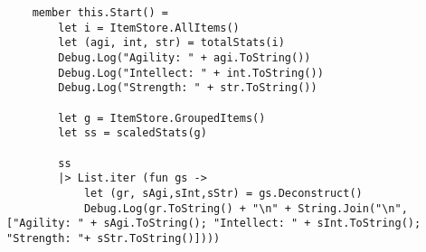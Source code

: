 \begin{listing}[H]
\begin{verbatim}
    member this.Start() =
        let i = ItemStore.AllItems()
        let (agi, int, str) = totalStats(i)
        Debug.Log("Agility: " + agi.ToString())
        Debug.Log("Intellect: " + int.ToString())
        Debug.Log("Strength: " + str.ToString())

        let g = ItemStore.GroupedItems()
        let ss = scaledStats(g)

        ss
        |> List.iter (fun gs ->
            let (gr, sAgi,sInt,sStr) = gs.Deconstruct()
            Debug.Log(gr.ToString() + "\n" + String.Join("\n", ["Agility: " + sAgi.ToString(); "Intellect: " + sInt.ToString(); "Strength: "+ sStr.ToString()])))
\end{verbatim}
\end{listing}
